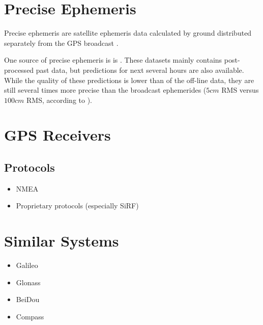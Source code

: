 \section{Precise Ephemeris}
Precise ephemeris are satellite ephemeris data calculated by ground distributed
separately from the GPS broadcast \cite{macdonald01}.

One source of precise ephemeris is is \cite{orbit-data}.
These datasets mainly contains post-processed past data, but predictions for
next several hours are also available.
While the quality of these predictions is lower than of the off-line data,
they are still several times more precise than the broadcast ephemerides
(\(5 cm\) RMS versus \(100 cm\) RMS, according to \cite{orbit-data}).


\section{GPS Receivers}
\subsection{Protocols}
\begin{itemize}
\item NMEA
\item Proprietary protocols (especially SiRF)
\end{itemize}

\section{Similar Systems}
\begin{itemize}
\item Galileo
\item Glonass
\item BeiDou
\item Compass
\end{itemize}
